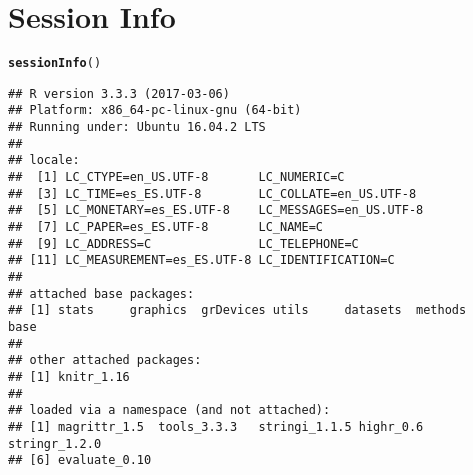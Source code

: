 \documentclass{article}\usepackage[]{graphicx}\usepackage[]{color}
\makeatletter
\newcommand{\hlstd}[1]{\textcolor[rgb]{0.345,0.345,0.345}{#1}}%
\newcommand{\hlkwd}[1]{\textcolor[rgb]{0.737,0.353,0.396}{\textbf{#1}}}%
\newenvironment{kframe}{%
 \def\at@end@of@kframe{}%
 \ifinner\ifhmode%
  \def\at@end@of@kframe{\end{minipage}}%
  \begin{minipage}{\columnwidth}%
 \fi\fi%
 \def\FrameCommand##1{\hskip\@totalleftmargin \hskip-\fboxsep
 \colorbox{shadecolor}{##1}\hskip-\fboxsep
     \hskip-\linewidth \hskip-\@totalleftmargin \hskip\columnwidth}%
 \MakeFramed {\advance\hsize-\width
   \@totalleftmargin\z@ \linewidth\hsize
   \@setminipage}}%
 {\par\unskip\endMakeFramed%
 \at@end@of@kframe}
\newenvironment{knitrout}{}{} %
\makeatother
\begin{document}
\section{Session Info}%
  
\begin{knitrout}
\color{fgcolor}\begin{kframe}
\begin{alltt}
\hlkwd{sessionInfo}\hlstd{()}
\end{alltt}
\begin{verbatim}
## R version 3.3.3 (2017-03-06)
## Platform: x86_64-pc-linux-gnu (64-bit)
## Running under: Ubuntu 16.04.2 LTS
## 
## locale:
##  [1] LC_CTYPE=en_US.UTF-8       LC_NUMERIC=C              
##  [3] LC_TIME=es_ES.UTF-8        LC_COLLATE=en_US.UTF-8    
##  [5] LC_MONETARY=es_ES.UTF-8    LC_MESSAGES=en_US.UTF-8   
##  [7] LC_PAPER=es_ES.UTF-8       LC_NAME=C                 
##  [9] LC_ADDRESS=C               LC_TELEPHONE=C            
## [11] LC_MEASUREMENT=es_ES.UTF-8 LC_IDENTIFICATION=C       
## 
## attached base packages:
## [1] stats     graphics  grDevices utils     datasets  methods   base     
## 
## other attached packages:
## [1] knitr_1.16
## 
## loaded via a namespace (and not attached):
## [1] magrittr_1.5  tools_3.3.3   stringi_1.1.5 highr_0.6     stringr_1.2.0
## [6] evaluate_0.10
\end{verbatim}
\end{kframe}
\end{knitrout}
\end{document}
